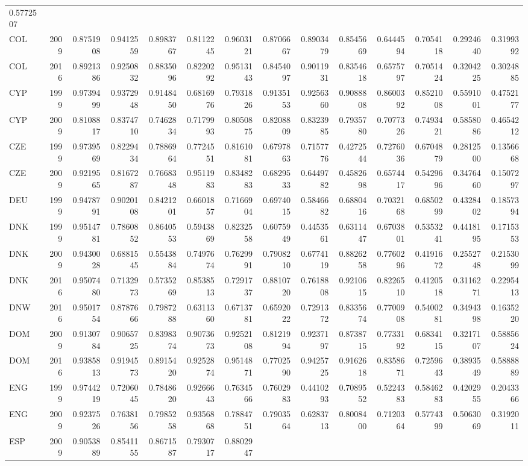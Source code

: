 \documentclass[]{article}
\begin{document}
\begin{longtable}[]{@{}lrrrrrrrrrrrrr@{}}
0.5772507\tabularnewline
COL & 2009 & 0.8751908 & 0.9412559 & 0.8983767 & 0.8112245 & 0.9603121 &
0.8706667 & 0.8903479 & 0.8545669 & 0.6444594 & 0.7054118 & 0.2924640 &
0.3199392\tabularnewline
COL & 2016 & 0.8921386 & 0.9250832 & 0.8835096 & 0.8220292 & 0.9513143 &
0.8454097 & 0.9011931 & 0.8354618 & 0.6575797 & 0.7051424 & 0.3204225 &
0.3024885\tabularnewline
CYP & 1999 & 0.9739499 & 0.9372948 & 0.9148450 & 0.6816976 & 0.7931826 &
0.9135153 & 0.9256360 & 0.9088808 & 0.8600392 & 0.8521008 & 0.5591001 &
0.4752177\tabularnewline
CYP & 2009 & 0.8108817 & 0.8374710 & 0.7462834 & 0.7179993 & 0.8050875 &
0.8208809 & 0.8323985 & 0.7935780 & 0.7077326 & 0.7493421 & 0.5858086 &
0.4654212\tabularnewline
CZE & 1999 & 0.9739569 & 0.8229434 & 0.7886964 & 0.7724551 & 0.8161081 &
0.6797863 & 0.7157776 & 0.4272544 & 0.7276036 & 0.6704879 & 0.2812500 &
0.1356668\tabularnewline
CZE & 2009 & 0.9219565 & 0.8167287 & 0.7668348 & 0.9511983 & 0.8348283 &
0.6829533 & 0.6449782 & 0.4582698 & 0.6574417 & 0.5429696 & 0.3476460 &
0.1507297\tabularnewline
DEU & 1999 & 0.9478791 & 0.9020108 & 0.8421201 & 0.6601857 & 0.7166904 &
0.6974015 & 0.5846682 & 0.6880416 & 0.7032168 & 0.6850299 & 0.4328402 &
0.1857394\tabularnewline
DNK & 1999 & 0.9514781 & 0.7860852 & 0.8640553 & 0.5943869 & 0.8232558 &
0.6075949 & 0.4453561 & 0.6311447 & 0.6703801 & 0.5353241 & 0.4418195 &
0.1715353\tabularnewline
DNK & 2009 & 0.9430028 & 0.6881545 & 0.5543884 & 0.7497674 & 0.7629991 &
0.7908210 & 0.6774119 & 0.8826258 & 0.7760296 & 0.4191672 & 0.2552748 &
0.2153099\tabularnewline
DNK & 2016 & 0.9507480 & 0.7132973 & 0.5735269 & 0.8538513 & 0.7291737 &
0.8810720 & 0.7618808 & 0.9210615 & 0.8226510 & 0.4120518 & 0.3116271 &
0.2295413\tabularnewline
DNW & 2016 & 0.9501754 & 0.8787666 & 0.7987288 & 0.6311360 & 0.6713781 &
0.6592022 & 0.7291372 & 0.8335674 & 0.7700908 & 0.5400281 & 0.3494398 &
0.1635220\tabularnewline
DOM & 2009 & 0.9130784 & 0.9065725 & 0.8398374 & 0.9073673 & 0.9252108 &
0.8121994 & 0.9237197 & 0.8738715 & 0.7733192 & 0.6834115 & 0.3217107 &
0.5885624\tabularnewline
DOM & 2016 & 0.9385813 & 0.9194573 & 0.8915420 & 0.9252874 & 0.9514871 &
0.7702590 & 0.9425725 & 0.9162618 & 0.8358671 & 0.7259643 & 0.3893549 &
0.5888889\tabularnewline
ENG & 1999 & 0.9744219 & 0.7206045 & 0.7848620 & 0.9266643 & 0.7634566 &
0.7602983 & 0.4410293 & 0.7089552 & 0.5224383 & 0.5846283 & 0.4202955 &
0.2043366\tabularnewline
ENG & 2009 & 0.9237526 & 0.7638156 & 0.7985258 & 0.9356868 & 0.7884751 &
0.7903564 & 0.6283713 & 0.8008400 & 0.7120364 & 0.5774399 & 0.5063069 &
0.3192011\tabularnewline
ESP & 2009 & 0.9053889 & 0.8541155 & 0.8671587 & 0.7930717 & 0.8802947 &

\end{longtable}
\end{document}
